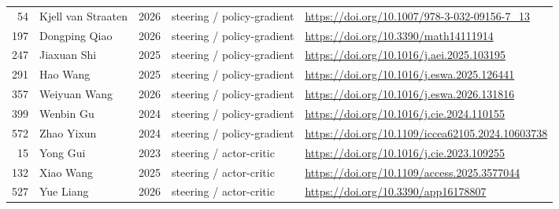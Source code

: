 \begin{longtable}{r p{3.0cm} r p{4.2cm} p{4.6cm}}
54 & Kjell van Straaten & 2026 & steering / policy-gradient & \url{https://doi.org/10.1007/978-3-032-09156-7_13} \\
197 & Dongping Qiao & 2026 & steering / policy-gradient & \url{https://doi.org/10.3390/math14111914} \\
247 & Jiaxuan Shi & 2025 & steering / policy-gradient & \url{https://doi.org/10.1016/j.aei.2025.103195} \\
291 & Hao Wang & 2025 & steering / policy-gradient & \url{https://doi.org/10.1016/j.eswa.2025.126441} \\
357 & Weiyuan Wang & 2026 & steering / policy-gradient & \url{https://doi.org/10.1016/j.eswa.2026.131816} \\
399 & Wenbin Gu & 2024 & steering / policy-gradient & \url{https://doi.org/10.1016/j.cie.2024.110155} \\
572 & Zhao Yixun & 2024 & steering / policy-gradient & \url{https://doi.org/10.1109/iccea62105.2024.10603738} \\
15 & Yong Gui & 2023 & steering / actor-critic & \url{https://doi.org/10.1016/j.cie.2023.109255} \\
132 & Xiao Wang & 2025 & steering / actor-critic & \url{https://doi.org/10.1109/access.2025.3577044} \\
527 & Yue Liang & 2026 & steering / actor-critic & \url{https://doi.org/10.3390/app16178807} \\
\bottomrule
\end{longtable}
